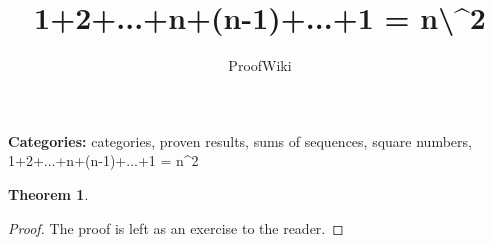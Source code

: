 \documentclass{article}
\title{1+2+...+n+(n-1)+...+1 = n\textbackslash{}^{}2}
\author{ProofWiki}
\date{}
\newtheorem{theorem}{Theorem}
\begin{document}
\maketitle

\noindent\textbf{Categories:} categories, proven results, sums of sequences, square numbers, 1+2+...+n+(n-1)+...+1 = n^2

\begin{theorem}

\end{theorem}

\begin{proof}
The proof is left as an exercise to the reader.
\end{proof}
\end{document}
